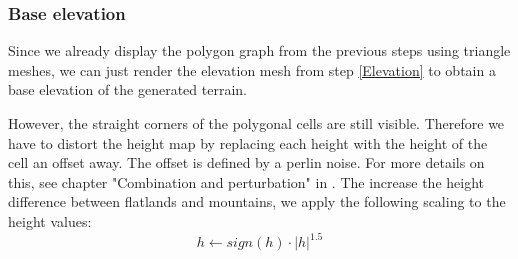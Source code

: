 \documentclass[journal, letterpaper]{IEEEtran}
\begin{document}
\subsubsection{Base elevation}
Since we already display the polygon graph from the previous steps using triangle meshes, we can just render the elevation mesh from step \ref{Elevation} to obtain a base elevation of the generated terrain. 

However, the straight corners of the polygonal cells are still visible. Therefore we have to distort the height map by replacing each height with the height of the cell an offset away. The offset is defined by a perlin noise. For more details on this, see chapter "Combination and perturbation" in \cite{JacobOlsen.2004}. The increase the height difference between flatlands and mountains, we apply the following scaling to the height values:
\begin{equation}
	h \leftarrow sign(h) \cdot |h|^{1.5}
\label{eq:HeightScaling}
\end{equation}
\end{document}
